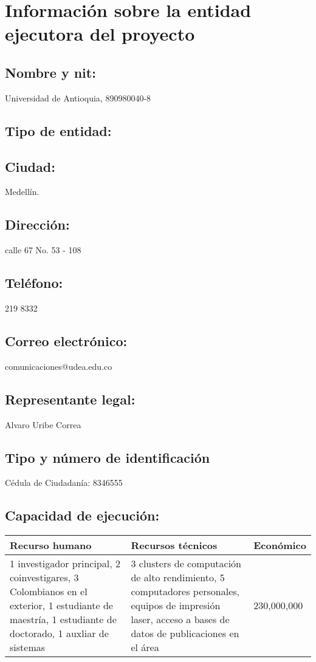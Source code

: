\section{Información sobre la entidad ejecutora del proyecto}
\subsection{Nombre y nit:    }
Universidad de Antioquia, 890980040-8
\subsection{Tipo de entidad: }
\subsection{Ciudad:                        }
Medellín.
\subsection{Dirección:                     }
calle 67 No. 53 - 108 
\subsection{Teléfono:                      }
 219 8332 
\subsection{Correo electrónico:            }
comunicaciones@udea.edu.co 
\subsection{Representante legal:           }
Alvaro Uribe Correa
\subsection{Tipo y número de identificación}
Cédula de Ciudadanía: 8346555
\subsection{Capacidad de ejecución:        }
\begin{tabular}{|p{5cm}|p{5cm}|p{5cm}|}\hline
    Recurso humano & Recursos técnicos & Económico\\\hline
    1 investigador principal, 2 coinvestigares, 3 Colombianos en el exterior, 1 estudiante de maestría, 1 estudiante de doctorado, 1 auxliar de sistemas &3 clusters de computación de alto rendimiento, 5 computadores personales, equipos de impresión laser, acceso a bases de datos de publicaciones en el área &230,000,000\\  \hline
\end{tabular}




